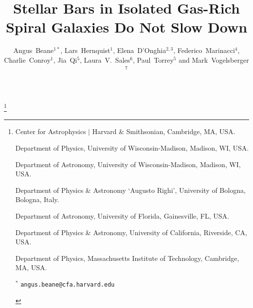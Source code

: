\documentclass[twoside]{natureprintstyle}
\title{Stellar Bars in Isolated Gas-Rich Spiral Galaxies Do Not Slow Down}
\author{Angus~Beane$^{1*}$, Lars~Hernquist$^1$, Elena~D'Onghia$^{2,3}$,
Federico~Marinacci$^{4}$, Charlie~Conroy$^{1}$, Jia~Qi$^{5}$,
Laura~V.~Sales$^{6}$, Paul~Torrey$^{5}$ and Mark~Vogelsberger$^{7}$
}
\begin{document}
\makeatletter
\let\ps@plain\ps@fancy
\makeatother

\maketitle

{\let\thefootnote\relax\footnote{

\begin{affiliations}
\item Center for Astrophysics $|$ Harvard \& Smithsonian,  Cambridge, MA, USA.

\item Department of Physics, University of Wisconsin-Madison, Madison, WI, USA.

\item Department of Astronomy, University of Wisconsin-Madison, Madison, WI, USA.

\item Department of Physics \& Astronomy `Augusto Righi', University of Bologna, Bologna, Italy.

\item Department of Astronomy, University of Florida, Gainesville, FL, USA.

\item Department of Physics \& Astronomy, University of California, Riverside, CA, USA.

\item Department of Physics, Massachusetts Institute of Technology, Cambridge, MA, USA.

$^{*}$ \texttt{\mbox{angus.beane@cfa.harvard.edu}}

\end{affiliations}
}}

\end{document}
